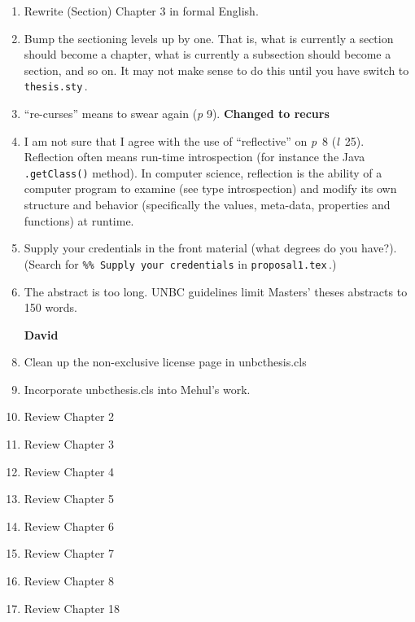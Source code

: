 \begin{scope}
\begin{enumerate}
  If you don't like the shape of the paragraphs that you get without
  \Verb!paragraph!, use something like
  \begin{Verbatim}
\setlength{\parindent}{3em}
\setlength{\parskip}{2\baselineskip}
  \end{Verbatim}
  to adjust either the initial paragraph indent, or the inter-paragraph
  space.

\item
  Rewrite (Section) Chapter 3 in formal English.

\item
  Bump the sectioning levels up by one.  That is, what is currently a
  section should become a chapter, what is currently a subsection should
  become a section, and so on.  It may not make sense to do this until
  you have switch to \Verb!thesis.sty!\,.

\item
  ``re-curses'' means to swear again (\textit{p} 9). \textbf{Changed to recurs}
\item
  I am not sure that I agree with the use of ``reflective'' on
  \textit{p}~8 (\textit{l}~25).  Reflection often means run-time
  introspection (for instance the Java \Verb!.getClass()! method).
  In computer science, reflection is the ability of a computer program to examine (see type introspection) and modify its own structure and behavior (specifically the values, meta-data, properties and functions) at runtime.
  
\item
  Supply your credentials in the front material (what degrees do you
  have?).
  (Search for \Verb!%

\item
  The abstract is too long. UNBC guidelines limit Masters' theses
  abstracts to 150 words.

\item [\textbf{David}]
\item Clean up the non-exclusive license page in unbcthesis.cls
\item Incorporate unbcthesis.cls into Mehul's work.
\item Review Chapter 2
\item Review Chapter 3
\item Review Chapter 4
\item Review Chapter 5
\item Review Chapter 6
\item Review Chapter 7
\item Review Chapter 8
\item Review Chapter 18


\end{enumerate}
\end{scope}
